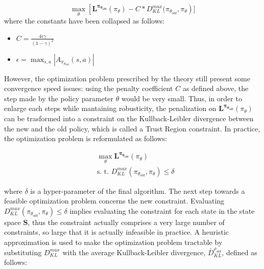                 \begin{equation}
                    \label{eq:trpo_opt_theta}
                    \max_{\theta} \left[ \mathbf{L^{\pi_{\theta_{old}}}}(\pi_{\theta}) - C*D_{KL}^{max}(\pi_{\theta_{old}}, \pi_{\theta}\right)]
                \end{equation}
                where the constants have been collapsed as follows:
                \begin{itemize}
                    \item $C = \frac{4 \epsilon \gamma}{\left( 1 - \gamma \right)^2}$
                    \item $\epsilon = \max_{s, a} | A_{\pi_{\theta_{old}}}(s, a) |$
                \end{itemize}
                However, the optimization problem prescribed by the theory still present some convergence speed issues: using the penalty coefficient $C$ as defined above, the step made by the policy parameter $\theta$ would be very small. Thus, in order to enlarge each steps while mantaining robusticity, the penalization on $\mathbf{L^{\pi_{\theta_{old}}}}(\pi_{\theta})$ can be trasformed into a constraint on the Kullback-Leibler divergence between the new and the old policy, which is called a Trust Region constraint. In practice, the optimization problem is reformulated as follows:
                
                \begin{align}
                    \label{eq:trpo_opt_theta_constraint}
                    &\max_{\theta} \mathbf{L^{\pi_{\theta_{old}}}}(\pi_{\theta}) \\
                    &\text{s. t. } D_{KL}^{max}(\pi_{\theta_{old}}, \pi_{\theta}) \leq \delta \nonumber
                \end{align}
                
                where $\delta$ is a hyper-parameter of the final algorithm. The next step towards a feasible optimization problem concerns the new constraint. Evaluating $D_{KL}^{max}(\pi_{\theta_{old}}, \pi_{\theta}) \leq \delta$ implies evaluating the constraint for each state in the state space $\mathbf{S}$, thus the constraint actually comprises a very large number of constraints, so large that it is actually infeasible in practice. A heuristic approximation is used to make the optimization problem tractable by substituting $D_{KL}^{max}$ with the average Kullback-Leibler divergence, $\bar{D}^{\rho_{old}}_{KL}$, defined as follows:
                
